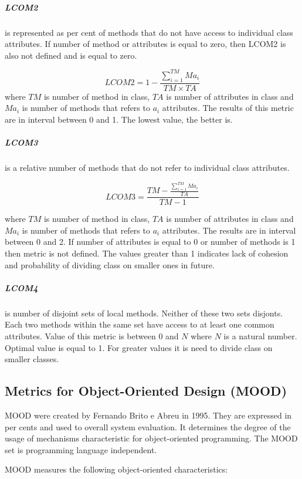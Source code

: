 \subparagraph*{LCOM2} is represented as per cent of methods that do not have access to individual class attributes. If number of method or attributes is equal to zero, then LCOM2 is also not defined and is equal to zero. 

\begin{equation}
LCOM2=1-\frac { \sum _{ i=1 }^{ TM }{ { Ma }_{ i } }  }{ TM\times TA } 
\end{equation}
where $TM$ is number of method in class, $TA$ is number of attributes in class and $Ma_{i}$ is number of methods that refers to $a_{i}$ attributes. The results of this metric are in interval between 0 and 1. The lowest value, the better is. 

\subparagraph*{LCOM3} is a relative number of methods that do not refer to individual class attributes.

\begin{equation}
LCOM3=\frac { TM-\frac { \sum _{ i=1 }^{ TM }{ { Ma }_{ i } }  }{ TA }  }{ TM-1 } 
\end{equation}

where $TM$ is number of method in class, $TA$ is number of attributes in class and $Ma_{i}$ is number of methods that refers to $a_{i}$ attributes. The results are in interval between 0 and 2. If number of attributes is equal to 0 or number of methods is 1 then metric is not defined. The values greater than 1 indicates lack of cohesion and probability of dividing class on smaller ones in future. 

\subparagraph*{LCOM4} is number of disjoint sets of local methods. Neither of these two sets disjonts. Each two methods within the same set have access to at least one common attributes. Value of this metric is between 0 and $N$ where $N$ is a natural number. Optimal value is equal to 1. For greater values it is need to divide class on smaller classes. 

\subsection{Metrics for Object-Oriented Design (MOOD)}
\ac{MOOD} were created by Fernando Brito e Abreu in 1995. They are expressed in per cents and used to overall system evaluation. It determines the degree of the usage of mechanisms characteristic for object-oriented programming. The \ac{MOOD} set is programming language independent. 

\ac{MOOD} measures the following object-oriented characteristics:

